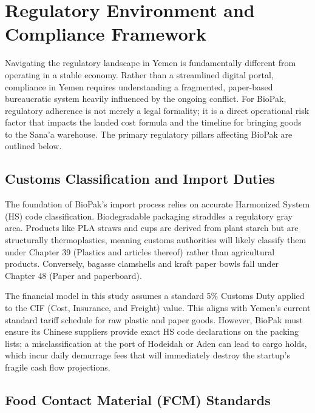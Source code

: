 \documentclass[12pt,a4paper]{article}
\begin{document}
\section{Regulatory Environment and Compliance Framework}

Navigating the regulatory landscape in Yemen is fundamentally different from operating in a stable economy. Rather than a streamlined digital portal, compliance in Yemen requires understanding a fragmented, paper-based bureaucratic system heavily influenced by the ongoing conflict. For BioPak, regulatory adherence is not merely a legal formality; it is a direct operational risk factor that impacts the landed cost formula and the timeline for bringing goods to the Sana'a warehouse. The primary regulatory pillars affecting BioPak are outlined below.

\subsection{Customs Classification and Import Duties}

The foundation of BioPak's import process relies on accurate Harmonized System (HS) code classification. Biodegradable packaging straddles a regulatory gray area. Products like PLA straws and cups are derived from plant starch but are structurally thermoplastics, meaning customs authorities will likely classify them under Chapter 39 (Plastics and articles thereof) rather than agricultural products. Conversely, bagasse clamshells and kraft paper bowls fall under Chapter 48 (Paper and paperboard).

The financial model in this study assumes a standard 5\% Customs Duty applied to the CIF (Cost, Insurance, and Freight) value. This aligns with Yemen's current standard tariff schedule for raw plastic and paper goods. However, BioPak must ensure its Chinese suppliers provide exact HS code declarations on the packing lists; a misclassification at the port of Hodeidah or Aden can lead to cargo holds, which incur daily demurrage fees that will immediately destroy the startup's fragile cash flow projections.

\subsection{Food Contact Material (FCM) Standards}
\end{document}
